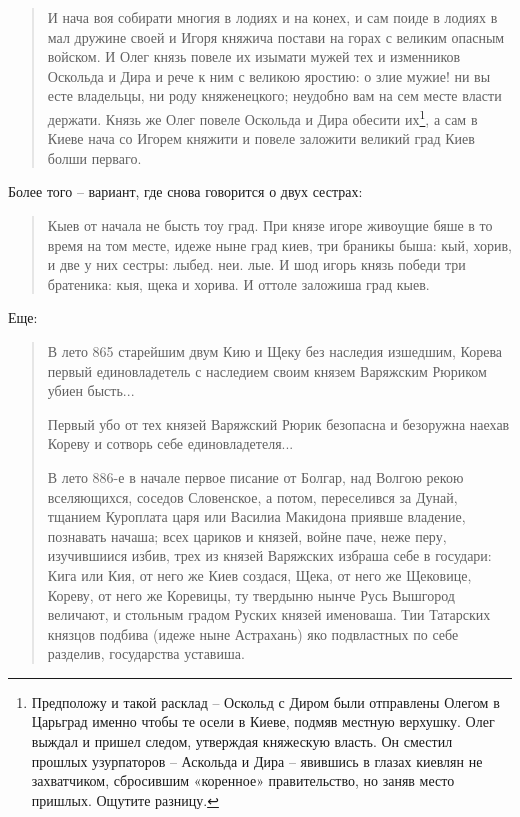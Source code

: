 \begin{quotation}
И нача воя собирати многия в лодиях и на конех, и сам поиде в лодиях в мал дружине своей и Игоря княжича постави на горах с великим опасным войском. И Олег князь повеле их изымати мужей тех и изменников Оскольда и Дира и рече к ним с великою яростию: о злие мужие! ни вы есте владельцы, ни роду княженецкого; неудобно вам на сем месте власти держати. Князь же Олег повеле Оскольда и Дира обесити их\footnote{Предположу и такой расклад – Оскольд с Диром были отправлены Олегом в Царьград именно чтобы те осели в Киеве, подмяв местную верхушку. Олег выждал и пришел следом, утверждая княжескую власть. Он сместил прошлых узурпаторов – Аскольда и Дира – явившись в глазах киевлян не захватчиком, сбросившим «коренное» правительство, но заняв место пришлых. Ощутите разницу.}, а сам в Киеве нача со Игорем княжити и повеле заложити великий град Киев болши перваго.
\end{quotation}

Более того – вариант, где снова говорится о двух сестрах:

\begin{quotation}
Кыев от начала не бысть тоу град. При князе игоре живоущие бяше в то время на том месте, идеже ныне град киев, три браникы быша: кый, хорив, и две у них сестры: лыбед. неи. лые. И шод игорь князь победи три братеника: кыя, щека и хорива. И оттоле заложиша град кыев.
\end{quotation}

Еще:

\begin{quotation}
В лето 865 старейшим двум Кию и Щеку без наследия изшедшим, Корева первый единовладетель с наследием своим князем Варяжским Рюриком убиен бысть...

Первый убо от тех князей Варяжский Рюрик безопасна и безоружна наехав Кореву и сотворь себе единовладетеля... 

В лето 886-е в начале первое писание от Болгар, над Волгою рекою вселяющихся, соседов Словенское, а потом, переселився за Дунай, тщанием Куроплата царя или Василиа Макидона приявше владение, познавать начаша; всех цариков и князей, войне паче, неже перу, изучившиися избив, трех из князей Варяжских избраша себе в государи: Кига или Кия, от него же Киев создася, Щека, от него же Щековице, Кореву, от него же Коревицы, ту твердыню нынче Русь Вышгород величают, и стольным градом Руских князей именоваша. Тии Татарских князцов подбива (идеже ныне Астрахань) яко подвластных по себе разделив, государства уставиша.
\end{quotation}

